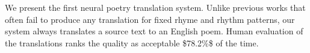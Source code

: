 We present the first neural poetry translation system. Unlike previous works that often fail to produce any translation for fixed rhyme and rhythm patterns, our system always translates a source text to an English poem. Human evaluation of the translations ranks the quality as acceptable \$78.2\%\$ of the time.
